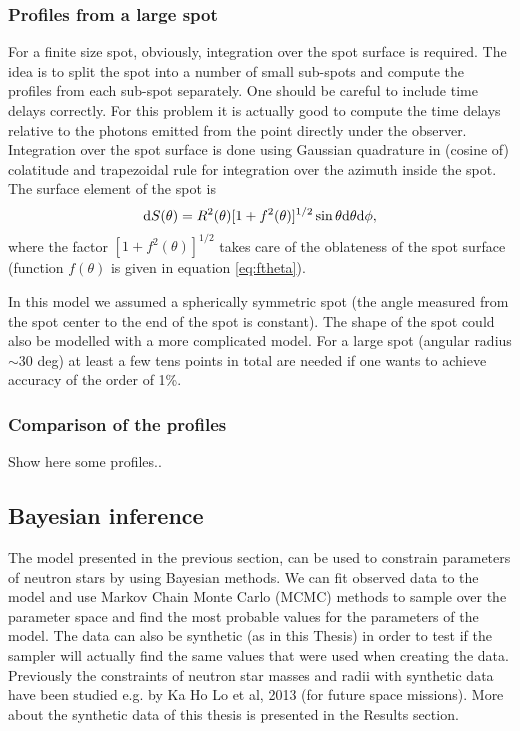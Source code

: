 \documentclass{wihuri}
\def\be{\begin{equation}}
\def\ee{\end{equation}}
\def\d{{\rm d}}
\begin{document}
\subsubsection{Profiles from a large spot} 

For a finite size spot, obviously, integration over the spot surface is required. 
The idea is to split the spot into a number of small sub-spots and compute the profiles from each sub-spot separately. One should be careful to include time delays correctly. For this problem it is actually good to compute the time delays relative to the photons emitted from the point directly under the observer. Integration over the spot surface is done using Gaussian quadrature in (cosine of) colatitude and trapezoidal rule for integration over the azimuth inside the spot. The surface element of the spot is 
\be \label{eq:surf_element}
\d S(\theta) = R^{2}(\theta) [1+f^{2}(\theta)]^{1/2} \sin \theta \d \theta \d \phi ,
\ee
where the factor $[1+f^{2}(\theta)]^{1/2}$ takes care of the oblateness of the spot surface (function $f(\theta)$ is given in equation \ref{eq:ftheta}).

In this model we assumed a spherically symmetric spot (the angle measured from the spot center to the end of the spot is constant). The shape of the spot could also be modelled with a more complicated model. For a large spot (angular radius $\sim$30 deg) at least a few tens points in total are needed if one wants to achieve accuracy of the order of 1\%.



\subsubsection{Comparison of the profiles}

Show here some profiles..


\subsection{Bayesian inference}

The model presented in the previous section, can be used to constrain parameters of neutron stars by using Bayesian methods. We can fit observed data to the model and use Markov Chain Monte Carlo  (MCMC) methods to sample over the parameter space and find the most probable values for the parameters of the model. The data can also be synthetic (as in this Thesis) in order to test if the sampler will actually find the same values that were used when creating the data. Previously the constraints of neutron star masses and radii with synthetic data have been studied e.g. by Ka Ho Lo et al, 2013 \cite{miller} (for future space missions). More about the synthetic data of this thesis is presented in the Results section. 
\end{document}
